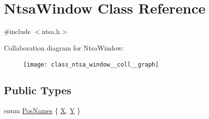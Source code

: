 \hypertarget{class_ntsa_window}{\section{Ntsa\-Window Class Reference}
\label{class_ntsa_window}
}


{\ttfamily \#include $<$ntsa.\-h$>$}



Collaboration diagram for Ntsa\-Window\-:\nopagebreak
\begin{figure}[H]
\begin{center}
\leavevmode
\texttt{[image: class\_ntsa\_window\_\_coll\_\_graph]}
\end{center}
\end{figure}
\subsection*{Public Types}
\begin{DoxyCompactItemize}
\item 
enum \hyperlink{class_ntsa_window_ad45cc5b45dd664a1dd979041e8ab17a3}{Pos\-Names} \{ \hyperlink{class_ntsa_window_ad45cc5b45dd664a1dd979041e8ab17a3a5959f03de015e8a12c91109a7ccd8ce2}{X}, 
\hyperlink{class_ntsa_window_ad45cc5b45dd664a1dd979041e8ab17a3ac63a6cdc64f8ce6c25e59baf4b53019f}{Y}
 \}
\end{DoxyCompactItemize}
